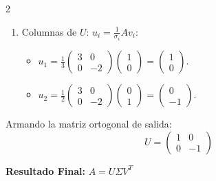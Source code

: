 \documentclass[10pt]{extarticle}
\begin{document}
\begin{multicols}{2}
\begin{enumerate}
\item Columnas de $U$: $u_i=\frac{1}{\sigma_i}Av_i$:
\begin{itemize}[leftmargin=1.2em]
\item $u_1=\frac13\begin{pmatrix}3&0\\0&-2\end{pmatrix}\begin{pmatrix}1\\0\end{pmatrix}=\begin{pmatrix}1\\0\end{pmatrix}$.
\item $u_2=\frac12\begin{pmatrix}3&0\\0&-2\end{pmatrix}\begin{pmatrix}0\\1\end{pmatrix}=\begin{pmatrix}0\\-1\end{pmatrix}$.
\end{itemize}
\end{enumerate}

Armando la matriz ortogonal de salida:
$$U=\begin{pmatrix}1&0\\0&-1\end{pmatrix}$$

\textbf{Resultado Final:} $A = U\Sigma V^T$
\end{multicols}
\end{document}
